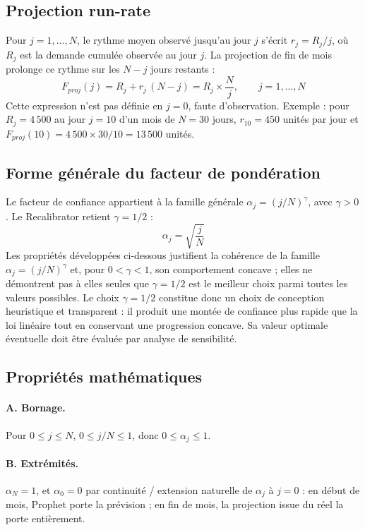 \documentclass[11pt,a4paper]{article}
\begin{document}
\subsection{Projection run-rate}

Pour $j=1,\dots,N$, le rythme moyen observé jusqu'au jour $j$ s'écrit $r_j = R_j/j$, où $R_j$ est la demande cumulée observée au jour $j$. La projection de fin de mois prolonge ce rythme sur les $N-j$ jours restants :
\[
F_{proj}(j) = R_j + r_j\,(N-j) = R_j\times\frac{N}{j}, \qquad j=1,\dots,N
\]
Cette expression n'est pas définie en $j=0$, faute d'observation. Exemple : pour $R_j=4\,500$ au jour $j=10$ d'un mois de $N=30$ jours, $r_{10}=450$ unités par jour et $F_{proj}(10)=4\,500\times30/10=13\,500$ unités.

\subsection{Forme générale du facteur de pondération}

Le facteur de confiance appartient à la famille générale $\alpha_j=(j/N)^{\gamma}$, avec $\gamma>0$. Le Recalibrator retient $\gamma=1/2$ :
\[
\boxed{\alpha_j = \sqrt{\frac{j}{N}}}
\]
Les propriétés développées ci-dessous justifient la cohérence de la famille $\alpha_j=(j/N)^{\gamma}$ et, pour $0<\gamma<1$, son comportement concave ; elles ne démontrent pas à elles seules que $\gamma=1/2$ est le meilleur choix parmi toutes les valeurs possibles. Le choix $\gamma=1/2$ constitue donc un choix de conception heuristique et transparent : il produit une montée de confiance plus rapide que la loi linéaire tout en conservant une progression concave. Sa valeur optimale éventuelle doit être évaluée par analyse de sensibilité.

\subsection{Propriétés mathématiques}

\paragraph{A. Bornage.} Pour $0\le j\le N$, $0\le j/N\le1$, donc $0\le\alpha_j\le1$.

\paragraph{B. Extrémités.} $\alpha_N=1$, et $\alpha_0=0$ par continuité / extension naturelle de $\alpha_j$ à $j=0$ : en début de mois, Prophet porte la prévision ; en fin de mois, la projection issue du réel la porte entièrement.
\end{document}
